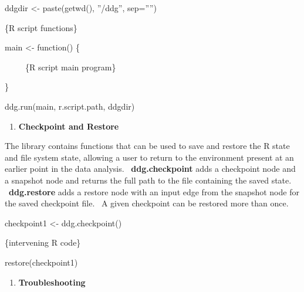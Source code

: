 \documentclass[letterpaper]{article}
\newcounter{saveenum}
\newcommand\liststyleWWNumxv{%
\renewcommand\theenumi{\arabic{enumi}}
\renewcommand\theenumii{\alph{enumii}}
\renewcommand\theenumiii{\alph{enumii}.\roman{enumiii}}
\renewcommand\theenumiv{\alph{enumii}.\roman{enumiii}.\arabic{enumiv}}
\renewcommand\labelenumi{\theenumi.}
\renewcommand\labelenumii{\theenumii.}
\renewcommand\labelenumiii{\theenumiii.}
\renewcommand\labelenumiv{\theenumiv.}
}
\begin{document}
\textcolor[rgb]{0.21176471,0.37254903,0.5686275}{ddgdir {\textless}- paste(getwd(), ''/ddg'', sep=''{}'')}


\bigskip

\textcolor[rgb]{0.21176471,0.37254903,0.5686275}{\{R script functions\}}


\bigskip

\textcolor[rgb]{0.21176471,0.37254903,0.5686275}{main {\textless}- function() \{}


\bigskip

\textcolor[rgb]{0.21176471,0.37254903,0.5686275}{\ \ \ \ \ \{R script main program\}}


\bigskip

\textcolor[rgb]{0.21176471,0.37254903,0.5686275}{\}}

\textcolor[rgb]{0.21176471,0.37254903,0.5686275}{ddg.run(main, r.script.path, ddgdir)}


\bigskip

\liststyleWWNumxv
\setcounter{saveenum}{\value{enumi}}
\begin{enumerate}
\setcounter{enumi}{\value{saveenum}}
\item \textbf{Checkpoint and Restore}
\end{enumerate}

\bigskip

The library contains functions that can be used to save and restore the R state and file system state, allowing a user to return to the environment present at an earlier point in the data analysis. \ \textbf{ddg.checkpoint} adds a checkpoint node and a snapshot node and returns the full path to the file containing the saved state. \ \textbf{ddg.restore} adds a restore node with an input edge from the snapshot node for the saved checkpoint file. \ A given checkpoint can be restored more than once.


\bigskip

\textcolor[rgb]{0.21176471,0.37254903,0.5686275}{checkpoint1 {\textless}- ddg.checkpoint()}


\bigskip

\textcolor[rgb]{0.21176471,0.37254903,0.5686275}{\{intervening R code\}}


\bigskip

\textcolor[rgb]{0.21176471,0.37254903,0.5686275}{restore(checkpoint1)}


\bigskip

\liststyleWWNumxv
\setcounter{saveenum}{\value{enumi}}
\begin{enumerate}
\setcounter{enumi}{\value{saveenum}}
\item \textbf{Troubleshooting}
\end{enumerate}
\end{document}
